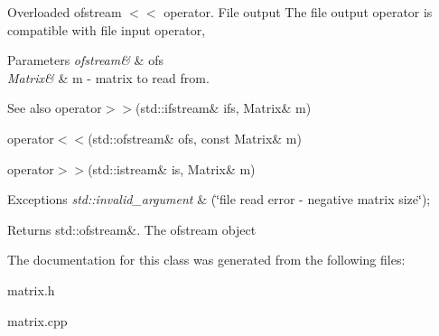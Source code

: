 Overloaded ofstream $<$$<$ operator. File output The file output operator is compatible with file input operator, 
\begin{DoxyParams}{Parameters}
{\em ofstream\&} & ofs \\
\hline
{\em Matrix\&} & m -\/ matrix to read from. \\
\hline
\end{DoxyParams}
\begin{DoxySeeAlso}{See also}
operator$>$$>$(std\+::ifstream\& ifs, Matrix\& m) 

operator$<$$<$(std\+::ofstream\& ofs, const Matrix\& m) 

operator$>$$>$(std\+::istream\& is, Matrix\& m) 
\end{DoxySeeAlso}

\begin{DoxyExceptions}{Exceptions}
{\em std\+::invalid\+\_\+argument} & (\char`\"{}file read error -\/ negative matrix size\char`\"{}); \\
\hline
\end{DoxyExceptions}
\begin{DoxyReturn}{Returns}
std\+::ofstream\&. The ofstream object 
\end{DoxyReturn}


The documentation for this class was generated from the following files\+:\begin{DoxyCompactItemize}
\item 
matrix.\+h\item 
matrix.\+cpp\end{DoxyCompactItemize}
